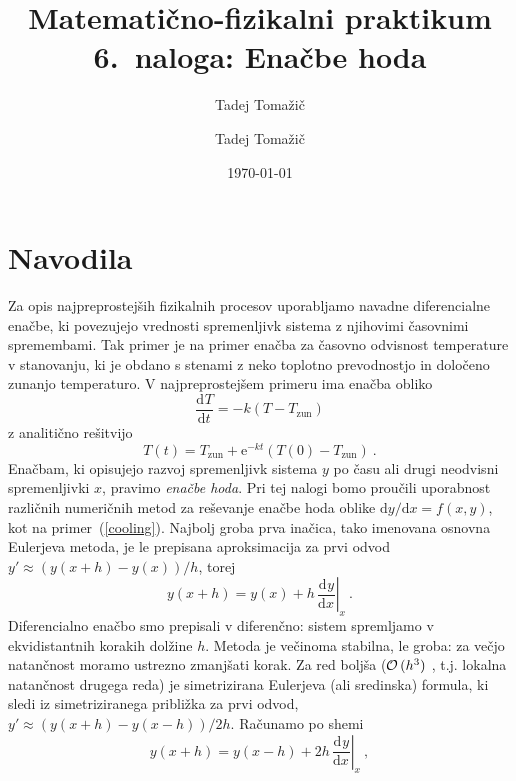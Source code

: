 \documentclass[slovene,11pt,a4paper]{article}
\title{
\sc\large Matematično-fizikalni praktikum \thisyear\\
\bigskip
\bf\Large 6.~naloga: Enačbe hoda
}
\author{Tadej Tomažič}
\date{}
\newcommand{\ddd}{\mathrm{d}}
\newcommand{\Dd}[3][{}]{\frac{\ddd^{#1} #2}{\ddd #3^{#1}}}
\begin{document}
\author{Tadej Tomažič}
\date{\today}

\maketitle

\newpage
{}
\tableofcontents
\listoffigures
\newpage
\section{Navodila}



Za opis najpreprostejših fizikalnih procesov uporabljamo
navadne diferencialne enačbe, ki povezujejo vrednosti
spremenljivk sistema z njihovimi časovnimi
spremembami. Tak primer je na primer enačba za časovno
odvisnost temperature v stanovanju, ki je obdano s stenami
z neko toplotno prevodnostjo in določeno zunanjo temperaturo.
V najpreprostejšem primeru ima enačba obliko
\begin{equation}
\Dd{T}{t} = - k \left( T-T_\mathrm{zun} \right)
\label{cooling}
\end{equation}
z analitično rešitvijo
\begin{equation*}
T(t) = T_\mathrm{zun} + \mathrm{e}^{-kt} \left( T(0) - T_\mathrm{zun} \right) \>.
\end{equation*}
Enačbam, ki opisujejo razvoj spremenljivk sistema $y$ po času ali drugi
neodvisni spremenljivki $x$, pravimo {\sl enačbe hoda\/}.  Pri tej
nalogi bomo proučili uporabnost različnih numeričnih metod
za reševanje enačbe hoda oblike $\ddd y/\ddd x = f(x, y)$,
kot na primer~(\ref{cooling}).   Najbolj groba
prva inačica, tako imenovana osnovna Eulerjeva metoda,
je le prepisana aproksimacija za prvi odvod
$y' \approx (y(x+h) - y(x)) / h$, torej
\begin{equation}
y(x+h) = y(x) + h\,\left.\Dd{y}{x}\right|_x \>.
\label{euler}
\end{equation}
Diferencialno enačbo smo prepisali
v diferenčno: sistem
spremljamo v ekvidistantnih korakih dolžine $h$. Metoda je
večinoma stabilna, le groba: za večjo natančnost moramo
ustrezno zmanjšati korak.   Za red boljša (${\cal O}\,(h^3 )$ , t.j. lokalna natančnost drugega reda)
je simetrizirana Eulerjeva (ali sredinska) formula, ki sledi
iz simetriziranega približka za prvi odvod,
$y' \approx (y(x+h) - y(x-h)) / 2h$.  Računamo po shemi
\begin{equation}
y(x+h) = y(x-h) + 2h\,\left.\Dd{y}{x}\right|_x \>,
\label{seuler}
\end{equation}
\end{document}

